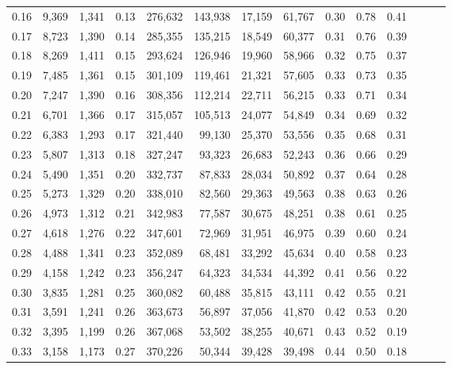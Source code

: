 \begin{tabular}{rrrrrrrrrrrrrr}
0.16 &   9,369 &  1,341 &  0.13 &  276,632 &  143,938 &  17,159 &  61,767 &  0.30 &  0.78 &      0.41 \\
0.17 &   8,723 &  1,390 &  0.14 &  285,355 &  135,215 &  18,549 &  60,377 &  0.31 &  0.76 &      0.39 \\
0.18 &   8,269 &  1,411 &  0.15 &  293,624 &  126,946 &  19,960 &  58,966 &  0.32 &  0.75 &      0.37 \\
0.19 &   7,485 &  1,361 &  0.15 &  301,109 &  119,461 &  21,321 &  57,605 &  0.33 &  0.73 &      0.35 \\
0.20 &   7,247 &  1,390 &  0.16 &  308,356 &  112,214 &  22,711 &  56,215 &  0.33 &  0.71 &      0.34 \\
0.21 &   6,701 &  1,366 &  0.17 &  315,057 &  105,513 &  24,077 &  54,849 &  0.34 &  0.69 &      0.32 \\
0.22 &   6,383 &  1,293 &  0.17 &  321,440 &   99,130 &  25,370 &  53,556 &  0.35 &  0.68 &      0.31 \\
0.23 &   5,807 &  1,313 &  0.18 &  327,247 &   93,323 &  26,683 &  52,243 &  0.36 &  0.66 &      0.29 \\
0.24 &   5,490 &  1,351 &  0.20 &  332,737 &   87,833 &  28,034 &  50,892 &  0.37 &  0.64 &      0.28 \\
0.25 &   5,273 &  1,329 &  0.20 &  338,010 &   82,560 &  29,363 &  49,563 &  0.38 &  0.63 &      0.26 \\
0.26 &   4,973 &  1,312 &  0.21 &  342,983 &   77,587 &  30,675 &  48,251 &  0.38 &  0.61 &      0.25 \\
0.27 &   4,618 &  1,276 &  0.22 &  347,601 &   72,969 &  31,951 &  46,975 &  0.39 &  0.60 &      0.24 \\
0.28 &   4,488 &  1,341 &  0.23 &  352,089 &   68,481 &  33,292 &  45,634 &  0.40 &  0.58 &      0.23 \\
0.29 &   4,158 &  1,242 &  0.23 &  356,247 &   64,323 &  34,534 &  44,392 &  0.41 &  0.56 &      0.22 \\
0.30 &   3,835 &  1,281 &  0.25 &  360,082 &   60,488 &  35,815 &  43,111 &  0.42 &  0.55 &      0.21 \\
0.31 &   3,591 &  1,241 &  0.26 &  363,673 &   56,897 &  37,056 &  41,870 &  0.42 &  0.53 &      0.20 \\
0.32 &   3,395 &  1,199 &  0.26 &  367,068 &   53,502 &  38,255 &  40,671 &  0.43 &  0.52 &      0.19 \\
0.33 &   3,158 &  1,173 &  0.27 &  370,226 &   50,344 &  39,428 &  39,498 &  0.44 &  0.50 &      0.18 \\

\end{tabular}
